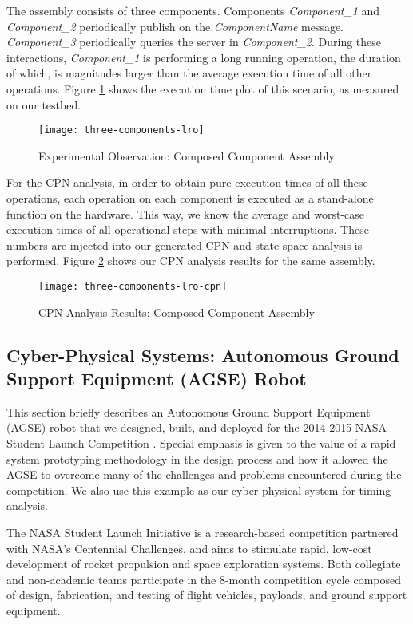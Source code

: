 The assembly consists of three components. Components \emph{Component\_1} and \emph{Component\_2} periodically publish on the \emph{ComponentName} message. \emph{Component\_3} periodically queries the server in \emph{Component\_2}. During these interactions, \emph{Component\_1} is performing a long running operation, the duration of which, is magnitudes larger than the average execution time of all other operations. Figure \ref{fig:three-components-lro} shows the execution time plot of this scenario, as measured on our testbed. 

\begin{figure}[h]
	\centering
	\texttt{[image: three-components-lro]}
	\caption{Experimental Observation: Composed Component Assembly}
	\label{fig:three-components-lro}
\end{figure}
\FloatBarrier

For the CPN analysis, in order to obtain pure execution times of all these operations, each operation on each component is executed as a stand-alone function on the hardware. This way, we know the average and worst-case execution times of all operational steps with minimal interruptions. These numbers are injected into our generated CPN and state space analysis is performed. Figure \ref{fig:three-components-lro-cpn} shows our CPN analysis results for the same assembly.


\begin{figure}[h]
	\centering
	\texttt{[image: three-components-lro-cpn]}
	\caption{CPN Analysis Results: Composed Component Assembly}
	\label{fig:three-components-lro-cpn}
\end{figure}
\FloatBarrier

\subsection{Cyber-Physical Systems: Autonomous Ground Support Equipment (AGSE) Robot}

This section briefly describes an Autonomous Ground Support Equipment
(AGSE) robot that we designed, built, and deployed for the 2014-2015
NASA Student Launch Competition \cite{NASA_SL}. Special emphasis is
given to the value of a rapid system prototyping methodology in the
design process and how it allowed the AGSE to overcome many of the
challenges and problems encountered during the competition.  We also use
this example as our cyber-physical system for timing analysis.

The NASA Student Launch Initiative \cite{NASA_SL} is a research-based
competition partnered with NASA's Centennial Challenges, and aims to
stimulate rapid, low-cost development of rocket propulsion and space
exploration systems.  Both collegiate and non-academic teams
participate in the 8-month competition cycle composed of design,
fabrication, and testing of flight vehicles, payloads, and ground
support equipment.

